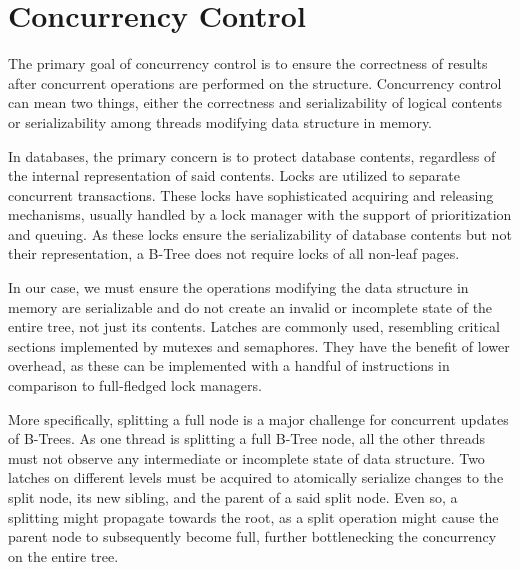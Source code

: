 \section{Concurrency Control}

The primary goal of concurrency control is to ensure the correctness of results after concurrent operations are performed on the structure. Concurrency control can mean two things, either the correctness and serializability of logical contents or serializability among threads modifying data structure in memory.

In databases, the primary concern is to protect database contents, regardless of the internal representation of said contents. Locks are utilized to separate concurrent transactions. These locks have sophisticated acquiring and releasing mechanisms, usually handled by a lock manager with the support of prioritization and queuing. As these locks ensure the serializability of database contents but not their representation, a B-Tree does not require locks of all non-leaf pages.

In our case, we must ensure the operations modifying the data structure in memory are serializable and do not create an invalid or incomplete state of the entire tree, not just its contents. Latches are commonly used, resembling critical sections implemented by mutexes and semaphores. They have the benefit of lower overhead, as these can be implemented with a handful of instructions in comparison to full-fledged lock managers.

More specifically, splitting a full node is a major challenge for concurrent updates of B-Trees. As one thread is splitting a full B-Tree node, all the other threads must not observe any intermediate or incomplete state of data structure. Two latches on different levels must be acquired to atomically serialize changes to the split node, its new sibling, and the parent of a said split node. Even so, a splitting might propagate towards the root, as a split operation might cause the parent node to subsequently become full, further bottlenecking the concurrency on the entire tree.